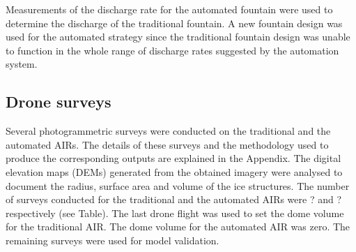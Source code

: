 \documentclass[tc, manuscript]{copernicus}
\begin{document}
Measurements of the discharge rate for the automated fountain were used to determine the discharge of the
traditional fountain. A new fountain design was used for the automated strategy since the traditional fountain
design was unable to function in the whole range of discharge rates suggested by the automation system.


\subsection{Drone surveys}

Several photogrammetric surveys were conducted on the traditional and the automated AIRs. The details of these
surveys and the methodology used to produce the corresponding outputs are explained in the Appendix. The digital
elevation maps (DEMs) generated from the obtained imagery were analysed to document the radius, surface area and
volume of the ice structures. The number of surveys conducted for the traditional and the automated AIRs were
? and ? respectively (see Table). The last drone flight was used to set the dome volume for the traditional AIR.
The dome volume for the automated AIR was zero.  The remaining surveys were used for model validation.
\end{document}
